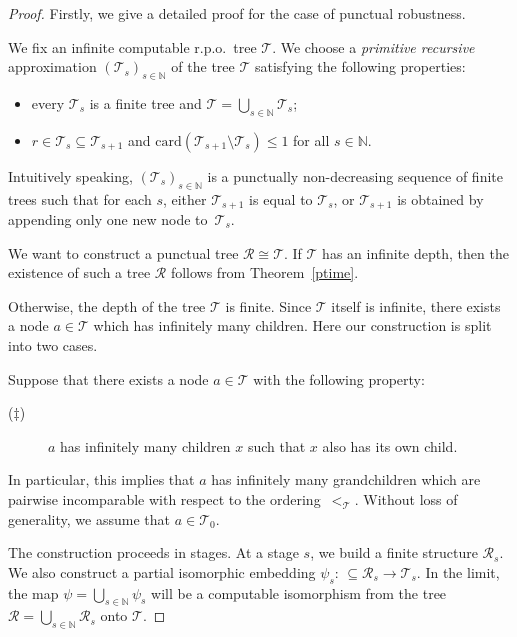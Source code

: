 \documentclass[a4paper,UKenglish,cleveref, autoref, thm-restate]{lipics-v2021}
\begin{document}
\begin{proof}
Firstly, we give a detailed proof for the case of punctual robustness.

We fix an infinite computable r.p.o.~tree $\mathcal{T}$. We choose a \emph{primitive recursive} approximation $(\mathcal{T}_s)_{s\in\mathbb{N}}$ of the tree $\mathcal{T}$ satisfying the following properties:
    \begin{itemize}
        \item every $\mathcal{T}_s$ is a finite tree and $\mathcal{T} = \bigcup_{s\in\mathbb{N}} \mathcal{T}_s$;

        \item $r\in \mathcal{T}_s \subseteq \mathcal{T}_{s+1}$ and $\mathrm{card}(\mathcal{T}_{s+1} \setminus \mathcal{T}_s) \leq 1$ for all $s\in\mathbb{N}$.
    \end{itemize}
    Intuitively speaking, $(\mathcal{T}_s)_{s\in\mathbb{N}}$ is a punctually non-decreasing sequence of finite trees such that for each $s$, either $\mathcal{T}_{s+1}$ is equal to $\mathcal{T}_s$, or $\mathcal{T}_{s+1}$ is obtained by appending only one new node to~$\mathcal{T}_s$.
    
    
    We want to construct a punctual tree $\mathcal{R} \cong \mathcal{T}$. If $\mathcal{T}$ has an infinite depth, then 
the existence of such a tree $\mathcal{R}$ follows from Theorem~\ref{ptime}.

    

Otherwise, the depth of the tree $\mathcal{T}$ is finite. Since $\mathcal{T}$ itself is infinite, there exists a node $a\in \mathcal{T}$ which has infinitely many children. Here our construction is split into two cases.

 Suppose that there exists a node $a\in\mathcal{T}$ with the following property: 
\begin{description}
	\item[($\ddagger$)] $a$ has infinitely many children $x$ such that $x$ also has its own child. 
\end{description}
In particular, this implies that $a$ has infinitely many grandchildren which are pairwise incomparable with respect to the ordering~$<_{\mathcal{T}}$.
Without loss of generality, we assume that $a \in \mathcal{T}_0$.

The construction proceeds in stages. At a stage $s$, we build a finite structure $\mathcal{R}_s$. We also construct a partial isomorphic embedding $\psi_s :\,\subseteq \mathcal{R}_s \to \mathcal{T}_s$. In the limit, the map $\psi = \bigcup_{s\in\mathbb{N}} \psi_s$ will be a computable isomorphism from the tree $\mathcal{R} = \bigcup_{s\in\mathbb{N}} \mathcal{R}_s$ onto $\mathcal{T}$.


\end{proof}
\end{document}
